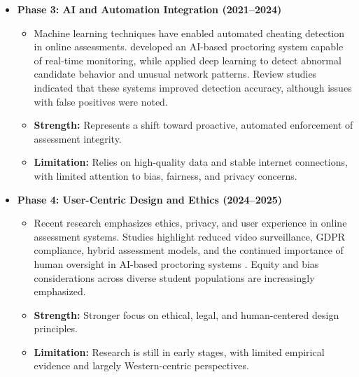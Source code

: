 \begin{itemize}
\item \textbf{Phase 3: AI and Automation Integration (2021–2024)}
    \begin{itemize}
        \item Machine learning techniques have enabled automated cheating detection in online assessments. \citet{JiaHe2021} developed an AI-based proctoring system capable of real-time monitoring, while \citet{TiongLee2021} applied deep learning to detect abnormal candidate behavior and unusual network patterns. Review studies indicated that these systems improved detection accuracy, although issues with false positives were noted.
        \item \textbf{Strength:} Represents a shift toward proactive, automated enforcement of assessment integrity.
        \item \textbf{Limitation:} Relies on high-quality data and stable internet connections, with limited attention to bias, fairness, and privacy concerns.
    \end{itemize}

\item \textbf{Phase 4: User-Centric Design and Ethics (2024–2025)}
    \begin{itemize}
        \item Recent research emphasizes ethics, privacy, and user experience in online assessment systems. Studies highlight reduced video surveillance, GDPR compliance, hybrid assessment models, and the continued importance of human oversight in AI-based proctoring systems \citep{Rahim2020, Ali2025, Arno2021}. Equity and bias considerations across diverse student populations are increasingly emphasized.
        \item \textbf{Strength:} Stronger focus on ethical, legal, and human-centered design principles.
        \item \textbf{Limitation:} Research is still in early stages, with limited empirical evidence and largely Western-centric perspectives.
    \end{itemize}


\end{itemize}
